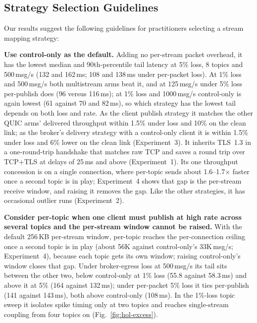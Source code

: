 \documentclass[a4paper,fleqn]{cas-dc}
\begin{document}
\subsection{Strategy Selection Guidelines}

Our results suggest the following guidelines for practitioners selecting a stream mapping strategy:

\textbf{Use control-only as the default.} Adding no per-stream packet overhead, it has the lowest median and 90th-percentile tail latency at 5\% loss, 8 topics and 500\,msg/s (132 and 162\,ms; 108 and 138\,ms under per-packet loss). At 1\% loss and 500\,msg/s both multistream arms beat it, and at 125\,msg/s under 5\% loss per-publish does (96 versus 116\,ms); at 1\% loss and 1000\,msg/s control-only is again lowest (61 against 70 and 82\,ms), so which strategy has the lowest tail depends on both loss and rate. As the client publish strategy it matches the other QUIC arms' delivered throughput within 1.5\% under loss and 10\% on the clean link; as the broker's delivery strategy with a control-only client it is within 1.5\% under loss and 6\% lower on the clean link (Experiment~3). It inherits TLS~1.3 in a one-round-trip handshake that matches raw TCP and saves a round trip over TCP+TLS at delays of 25\,ms and above (Experiment~1). Its one throughput concession is on a single connection, where per-topic sends about 1.6--1.7$\times$ faster once a second topic is in play; Experiment~4 shows that gap is the per-stream receive window, and raising it removes the gap. Like the other strategies, it has occasional outlier runs (Experiment~2).

\textbf{Consider per-topic when one client must publish at high rate across several topics and the per-stream window cannot be raised.} With the default 256\,KB per-stream window, per-topic reaches the per-connection ceiling once a second topic is in play (about 56K against control-only's 33K\,msg/s; Experiment~4), because each topic gets its own window; raising control-only's window closes that gap. Under broker-egress loss at 500\,msg/s its tail sits between the other two, below control-only at 1\% loss (55.8 against 58.3\,ms) and above it at 5\% (164 against 132\,ms); under per-packet 5\% loss it ties per-publish (141 against 143\,ms), both above control-only (108\,ms). In the 1\%-loss topic sweep it isolates spike timing only at two topics and reaches single-stream coupling from four topics on (Fig.~\ref{fig:hol-excess}).
\end{document}
